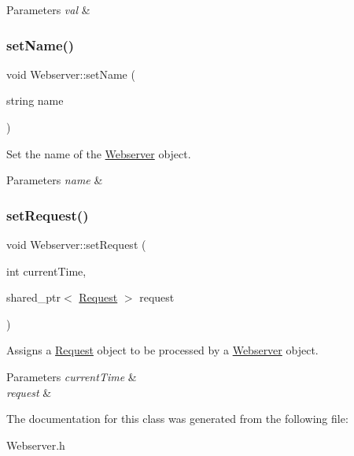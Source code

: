 \begin{DoxyParams}{Parameters}
{\em val} & \\
\hline
\end{DoxyParams}
\mbox{\label{classWebserver_aa4a2355e2a69cd811173efe85b158525}} 
\subsubsection{\texorpdfstring{set\+Name()}{setName()}}
{\footnotesize\ttfamily void Webserver\+::set\+Name (\begin{DoxyParamCaption}\item[{string}]{name }\end{DoxyParamCaption})\hspace{0.3cm}{\ttfamily [inline]}}



Set the name of the \hyperlink{classWebserver}{Webserver} object. 


\begin{DoxyParams}{Parameters}
{\em name} & \\
\hline
\end{DoxyParams}
\mbox{\label{classWebserver_af579724e554c818287932988c0de111e}} 
\subsubsection{\texorpdfstring{set\+Request()}{setRequest()}}
{\footnotesize\ttfamily void Webserver\+::set\+Request (\begin{DoxyParamCaption}\item[{int}]{current\+Time,  }\item[{shared\+\_\+ptr$<$ \hyperlink{classRequest}{Request} $>$}]{request }\end{DoxyParamCaption})\hspace{0.3cm}{\ttfamily [inline]}}



Assigns a \hyperlink{classRequest}{Request} object to be processed by a \hyperlink{classWebserver}{Webserver} object. 


\begin{DoxyParams}{Parameters}
{\em current\+Time} & \\
\hline
{\em request} & \\
\hline
\end{DoxyParams}


The documentation for this class was generated from the following file\+:\begin{DoxyCompactItemize}
\item 
Webserver.\+h\end{DoxyCompactItemize}

